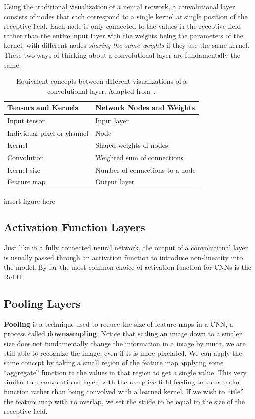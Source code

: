 \documentclass[12pt]{report}
\theoremstyle{definition}
\theoremstyle{remark}
\begin{document}
Using the traditional visualization of a neural network, a convolutional layer consists of nodes that each correspond to a single kernel at single position of the receptive field. Each node is only connected to the values in the receptive field rather than the entire input layer with the weights being the parameters of the kernel, with different nodes \textit{sharing the same weights} if they use the same kernel. These two ways of thinking about a convolutional layer are fundamentally the same.
\begin{table}[h]
    \centering
    \caption{Equivalent concepts between different visualizations of a convolutional layer. Adapted from~\cite{lee_convolutional_2021}.}
    \begin{tabular}{|l|l|}
        \hline
        \textbf{Tensors and Kernels} & \textbf{Network Nodes and Weights} \\
        \hline
        Input tensor & Input layer \\
        Individual pixel or channel & Node \\
        Kernel & Shared weights of nodes \\
        Convolution & Weighted sum of connections \\
        Kernel size & Number of connections to a node \\
        Feature map & Output layer \\
        \hline
    \end{tabular}
    \label{tab:cnn-architecture}
\end{table}

insert figure here

\subsection{Activation Function Layers}
Just like in a fully connected neural network, the output of a convolutional layer is usually passed through an activation function to introduce non-linearity into the model. By far the most common choice of activation function for CNNs is the ReLU\@.

\subsection{Pooling Layers}
\textbf{Pooling} is a technique used to reduce the size of feature maps in a CNN, a process called \textbf{downsampling}. Notice that scaling an image down to a smaler size does not fundamentally change the information in a image by much, we are still able to recognize the image, even if it is more pixelated. We can apply the same concept by taking a small region of the feature map applying some ``aggregate'' function to the values in that region to get a single value. This very similar to a convolutional layer, with the receptive field feeding to some scalar function rather than being convolved with a learned kernel. If we wish to ``tile'' the feature map with no overlap, we set the stride to be equal to the size of the receptive field.
\end{document}
